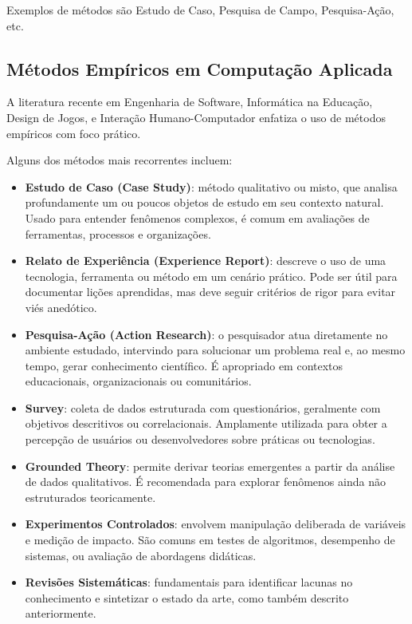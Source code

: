 Exemplos de métodos são Estudo de Caso, Pesquisa de Campo, Pesquisa-Ação, etc.

\subsection{Métodos Empíricos em Computação Aplicada}

A literatura recente em Engenharia de Software, Informática na Educação, Design de Jogos, e Interação Humano-Computador enfatiza o uso de métodos empíricos com foco prático. 

Alguns dos métodos mais recorrentes incluem:

\begin{itemize}
\item \textbf{Estudo de Caso (Case Study)}: método qualitativo ou misto, que analisa profundamente um ou poucos objetos de estudo em seu contexto natural. Usado para entender fenômenos complexos, é comum em avaliações de ferramentas, processos e organizações.
\item \textbf{Relato de Experiência (Experience Report)}: descreve o uso de uma tecnologia, ferramenta ou método em um cenário prático. Pode ser útil para documentar lições aprendidas, mas deve seguir critérios de rigor para evitar viés anedótico.
\item \textbf{Pesquisa-Ação (Action Research)}: o pesquisador atua diretamente no ambiente estudado, intervindo para solucionar um problema real e, ao mesmo tempo, gerar conhecimento científico. É apropriado em contextos educacionais, organizacionais ou comunitários.
\item \textbf{Survey}: coleta de dados estruturada com questionários, geralmente com objetivos descritivos ou correlacionais. Amplamente utilizada para obter a percepção de usuários ou desenvolvedores sobre práticas ou tecnologias.
\item \textbf{Grounded Theory}: permite derivar teorias emergentes a partir da análise de dados qualitativos. É recomendada para explorar fenômenos ainda não estruturados teoricamente\citet{glaser1967discovery}.
\item \textbf{Experimentos Controlados}: envolvem manipulação deliberada de variáveis e medição de impacto. São comuns em testes de algoritmos, desempenho de sistemas, ou avaliação de abordagens didáticas.
\item \textbf{Revisões Sistemáticas}: fundamentais para identificar lacunas no conhecimento e sintetizar o estado da arte, como também descrito anteriormente.
\end{itemize}

